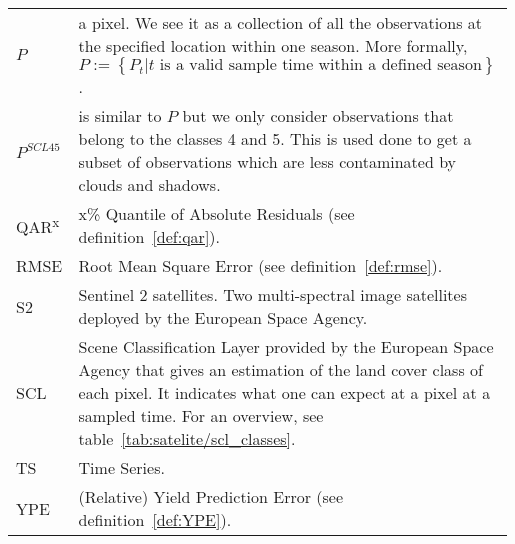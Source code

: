 \begin{longtable}{p{0.12\linewidth} p{0.87\linewidth}}
	$P$       & a pixel. We see it as a collection of all the observations at the specified location within one season. More formally, $P := \left\{P_t | t\text{ is a valid sample time within a defined season}\right\}$.\\
	$P^{SCL45}$       & is similar to $P$ but we only consider observations that belong to the classes 4 and 5. This is used done to get a subset of observations which are less contaminated by clouds and shadows.\\
	QAR\textsuperscript{x}       & x\% Quantile of Absolute Residuals  (see definition~\ref{def:qar}).\\
	RMSE         & Root Mean Square Error (see definition~\ref{def:rmse}).\\
	S2       & Sentinel 2 satellites. Two multi-spectral image satellites deployed by the European Space Agency.\\
	SCL       & Scene Classification Layer provided by the European Space Agency that gives an estimation of the land cover class of each pixel. It indicates what one can expect at a pixel at a sampled time. For an overview, see table~\ref{tab:satelite/scl_classes}.\\
	TS       & Time Series.\\
	YPE        & (Relative) Yield Prediction Error (see definition~\ref{def:YPE}).\\
\end{longtable} 

